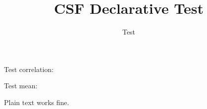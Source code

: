 \documentclass{article}
\title{CSF Declarative Test}
\author{Test}
\begin{document}
\maketitle

Test correlation: 

Test mean: 


Plain text works fine.
\end{document}
